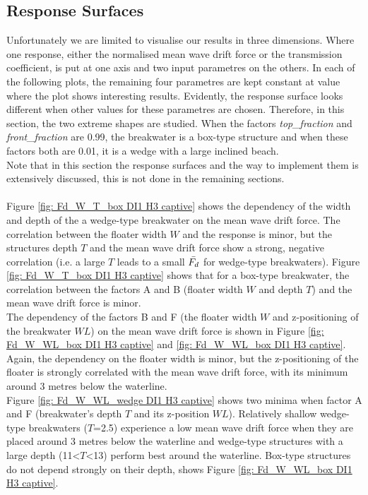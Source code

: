 \subsection{Response Surfaces}
\label{sec: DI1 captive H3 response surfaces}

Unfortunately we are limited to visualise our results in three dimensions. Where one response, either the normalised mean wave drift force or the transmission coefficient, is put at one axis and two input parametres on the others. In each of the following plots, the remaining four parametres are kept constant at value where the plot shows interesting results. Evidently, the response surface looks different when other values for these parametres are chosen. Therefore, in this section, the two extreme shapes are studied. When the factors \textit{top\_fraction} and \textit{front\_fraction} are 0.99, the breakwater is a box-type structure and when these factors both are 0.01, it is a wedge with a large inclined beach.  \\
Note that in this section the response surfaces and the way to implement them is extensively discussed, this is not done in the remaining sections. \\
\\
Figure \ref{fig: Fd_W_T_box DI1 H3 captive} shows the dependency of the width and depth of the a wedge-type breakwater on the mean wave drift force. The correlation between the floater width $W$ and the response is minor, but the structures depth $T$ and the mean wave drift force show a strong, negative correlation (i.e. a large $T$ leads to a small $\Bar{F_d}$ for wedge-type breakwaters). Figure \ref{fig: Fd_W_T_box DI1 H3 captive} shows that for a box-type breakwater, the correlation between the factors A and B (floater width $W$ and depth $T$) and the mean wave drift force is minor.\\
The dependency of the factors B and F (the floater width $W$ and z-positioning of the breakwater $WL$) on the mean wave drift force is shown in Figure \ref{fig: Fd_W_WL_box DI1 H3 captive} and \ref{fig: Fd_W_WL_box DI1 H3 captive}. Again, the dependency on the floater width is minor, but the z-positioning of the floater is strongly correlated with the mean wave drift force, with its minimum around 3 metres below the waterline.\\
Figure \ref{fig: Fd_W_WL_wedge DI1 H3 captive} shows two minima when factor A and F (breakwater's depth $T$ and its z-position $WL$). Relatively shallow wedge-type breakwaters ($T$=2.5) experience a low mean wave drift force when they are placed around 3 metres below the waterline and wedge-type structures with a large depth (11<$T$<13) perform best around the waterline. Box-type structures do not depend strongly on their depth, shows Figure \ref{fig: Fd_W_WL_box DI1 H3 captive}.





